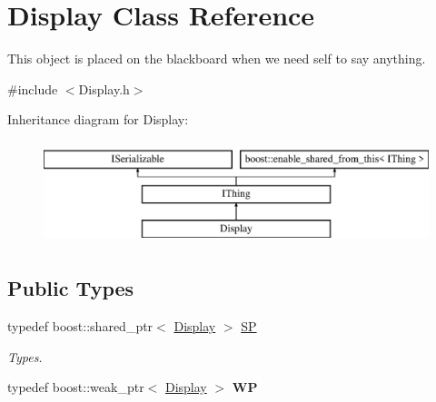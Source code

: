 \hypertarget{class_display}{}\section{Display Class Reference}
\label{class_display}


This object is placed on the blackboard when we need self to say anything.  




{\ttfamily \#include $<$Display.\+h$>$}

Inheritance diagram for Display\+:\begin{figure}[H]
\begin{center}
\leavevmode
\includegraphics[height=3.000000cm]{class_display}
\end{center}
\end{figure}
\subsection*{Public Types}
\begin{DoxyCompactItemize}
\item 
\mbox{\label{class_display_a6c34a315a515aeeb75a369d4aba4d7b3}} 
typedef boost\+::shared\+\_\+ptr$<$ \hyperlink{class_display}{Display} $>$ \hyperlink{class_display_a6c34a315a515aeeb75a369d4aba4d7b3}{SP}
\begin{DoxyCompactList}\small\item\em Types. \end{DoxyCompactList}\item 
\mbox{\label{class_display_a47d87d5f6a553e18403de6549580dbaf}} 
typedef boost\+::weak\+\_\+ptr$<$ \hyperlink{class_display}{Display} $>$ {\bfseries WP}
\end{DoxyCompactItemize}
